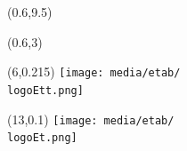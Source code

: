 \documentclass[a4paper]{article}
\newcommand{\NNT}{20XXSACLXXXX} 															%
\newcommand{\logoEt}{UPSUD} 																%
\newcommand{\vpos}{0.1}																	%
\newcommand{\hpos}{13}																		%
\newcommand{\logoEtt}{irfu-cea-saclay_orig-1}  																%
\newcommand{\vpostt}{0.215} 																	%
\newcommand{\hpostt}{6}																	%
\begin{document}
\begin{textblock}{1}(0.6,9.5)
	
	\Huge{}
\end{textblock}

\begin{textblock}{1}(0.6,3)
	\Large{\rotatebox{90}{\color{white}{NNT : \NNT}}}
\end{textblock}


                            

\begin{textblock}{1}(\hpostt,\vpostt)
	\texttt{[image: media/etab/\\logoEtt.png]}
\end{textblock}

\begin{textblock}{1}(\hpos,\vpos)
		\texttt{[image: media/etab/\\logoEt.png]}	
\end{textblock}
\end{document}
